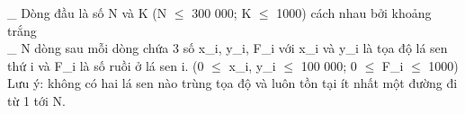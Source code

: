 \_ Dòng đầu là số N và K (N $\le$ 300 000; K $\le$ 1000) cách nhau bởi khoảng trắng   
\\   \_ N dòng sau mỗi dòng chứa 3 số x\_i, y\_i, F\_i với x\_i và y\_i là tọa độ lá sen thứ i và F\_i là số ruồi ở lá sen i.  (0  $\le$  x\_i, y\_i  $\le$  100 000; 0  $\le$  F\_i  $\le$ 1000)   
\\   Lưu ý: không có hai lá sen nào trùng tọa độ và luôn tồn tại ít nhất một đường đi từ 1 tới N.  

\